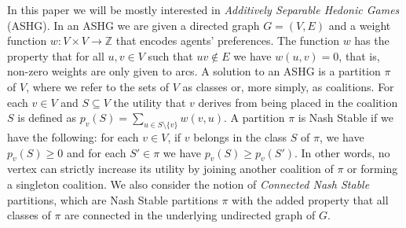 \documentclass[letterpaper,USenglish,cleveref, autoref, thm-restate]{lipics-v2021}
\begin{document}
%

In this paper we will be mostly interested in \emph{Additively Separable
Hedonic Games} (ASHG). In an ASHG we are given a directed graph $G=(V,E)$ and a
weight function $w:V\times V\to\mathbb{Z}$ that encodes agents' preferences.
The function $w$ has the property that for all $u,v\in V$ such that $uv\not\in
E$ we have $w(u,v)=0$, that is, non-zero weights are only given to arcs. A
solution to an ASHG is a partition $\pi$ of $V$, where we refer to the sets of
$V$ as classes or, more simply, as coalitions. For each $v\in V$ and
$S\subseteq V$ the utility that $v$ derives from being placed in the coalition
$S$ is defined as $p_v(S) = \sum_{u\in S\setminus\{v\}} w(v,u)$.  A partition
$\pi$ is Nash Stable if we have the following: for each $v\in V$, if $v$
belongs in the class $S$ of $\pi$, we have $p_v(S) \ge 0$ and for each $S'\in
\pi$ we have $p_v(S)\ge p_v(S')$. In other words, no vertex can strictly
increase its utility by joining another coalition of $\pi$ or forming a
singleton coalition.  We also consider the notion of \emph{Connected Nash
Stable} partitions, which are Nash Stable partitions $\pi$ with the added
property that all classes of $\pi$ are connected in the underlying undirected
graph of $G$.
\end{document}

